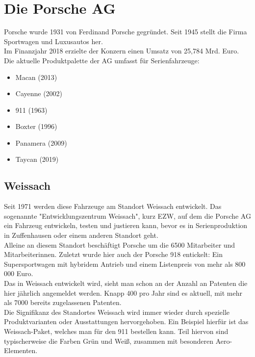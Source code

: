 \chapter{Die Porsche AG}
\label{chap:Intro}

Porsche wurde 1931 von Ferdinand Porsche gegründet. Seit 1945 stellt die Firma Sportwagen und Luxusautos her.\\
Im Finanzjahr 2018 erzielte der Konzern einen Umsatz von 25,784 Mrd. Euro.\\ %
Die aktuelle Produktpalette der AG umfasst für Serienfahrzeuge:\\

\begin{itemize}
	\item{Macan (2013)}
	\item{Cayenne (2002)}
	\item{911 (1963)}
	\item{Boxter (1996)}
	\item{Panamera (2009)}
	\item{Taycan (2019)}
 \end{itemize}

\section*{Weissach}

Seit 1971 werden diese Fahrzeuge am Standort Weissach entwickelt. Das sogenannte "Entwicklungszentrum Weissach", kurz EZW, auf dem die Porsche AG ein Fahrzeug entwickeln, testen und justieren kann, bevor es in Serienproduktion in Zuffenhausen oder einem anderen Standort geht. \\
Alleine an diesem Standort beschäftigt Porsche um die 6500 Mitarbeiter und Mitarbeiterinnen. Zuletzt wurde hier auch der Porsche 918 entickelt: Ein Supersportwagen mit hybridem Antrieb und einem Listenpreis von mehr als 800 000 Euro.\\
Das in Weissach entwickelt wird, sieht man schon an der Anzahl an Patenten die hier jährlich angemeldet werden. Knapp 400 pro Jahr sind es aktuell, mit mehr als 7000 bereits zugelassenen Patenten.\\
Die Signifikanz des Standortes Weissach wird immer wieder durch spezielle Produktvarianten oder Ausstattungen hervorgehoben. Ein Beispiel hierfür ist das Weissach-Paket, welches man für den 911 bestellen kann. Teil hiervon sind typischerweise die Farben Grün und Weiß, zusammen mit besonderen Aero-Elementen.



